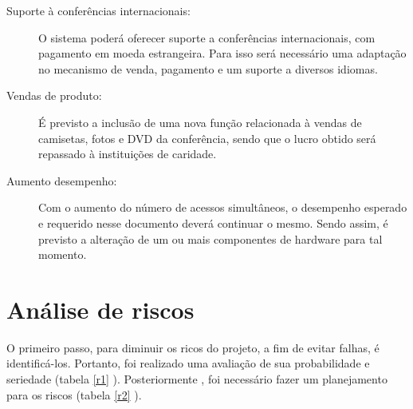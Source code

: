 \documentclass[letter]{article}
\begin{document}
\begin{description}

\item[Suporte à conferências internacionais:]  O sistema poderá oferecer suporte a conferências internacionais, com pagamento em moeda estrangeira. Para isso será necessário uma adaptação no mecanismo de venda, pagamento e um suporte a diversos idiomas.

\item[Vendas de produto:]  É previsto a inclusão de uma nova função relacionada à vendas de camisetas, fotos e DVD da conferência, sendo que o lucro obtido será repassado à instituições de caridade.

\item[Aumento desempenho:]  Com o aumento do número de acessos simultâneos, o desempenho esperado e requerido nesse documento deverá continuar o mesmo. Sendo assim, é previsto a alteração de um ou mais componentes de hardware para tal momento. 
\end{description}




\section{Análise de riscos}

O primeiro passo, para diminuir os ricos do projeto, a fim de evitar falhas, é identificá-los. Portanto, foi realizado uma avaliação de sua probabilidade e seriedade  (tabela \ref{r1} ). Posteriormente , foi necessário fazer um planejamento para os riscos (tabela \ref{r2} ).
 
\end{document}
